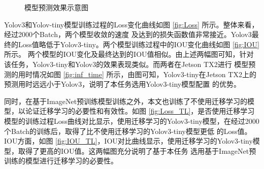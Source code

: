 \begin{figure}[t]
    \centering
    \caption{模型预测效果示意图}
    \label{fig:model_pre}
\end{figure}


Yolov3和Yolov-tiny模型训练过程的Loss变化曲线如图 \ref{fig:Loss} 所示。整体来看，经过2000个Batch，两个模型收敛的速度
及达到的损失函数值非常接近。Yolov3最终的Loss值略低于Yolov3-tiny。两个模型训练过程中的IOU变化曲线如图 \ref{fig:IOU} 所示。
两个模型的IOU变化及最终达到的IOU值相似。由上述两幅图可知，针对该任务，Yolov3-tiny和Yolov3的效果表现类似。而两者在Jetson TX2进行
模型预测的用时情况如图 \ref{fig:inf_time} 所示，由图可知，Yolov3-tiny在Jetson TX2上的预测用时远远小于Yolov3，说明了本任务选用Yolov3-tiny模型配置
的优势。

同时，在基于ImageNet预训练模型训练之外，本文也训练了不使用迁移学习的模型，以论证迁移学习的必要性和有效性。如图 \ref{fig:Loss_TL}，是否使用迁移学习
模型的训练过程Loss曲线对比显示，使用迁移学习的Yolov3-tiny模型，在经过2000个Batch的训练后，取得了比不使用迁移学习的Yolov3-tiny模型更低
的Loss值。IOU方面，如图 \ref{fig:IOU_TL}，IOU对比曲线显示，使用迁移学习的Yolov3-tiny模型，取得了更高的IOU值。这两幅图充分说明了基于本任务
选用基于ImageNet预训练的模型进行迁移学习的必要性。

